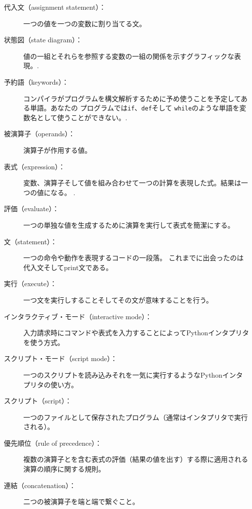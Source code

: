 \documentclass[a4j,12pt,makeidx]{jbook}
\begin{document}
{\begin{description}
\item[代入文（assignment statement）：]一つの値を一つの変数に割り当てる文。

\item[状態図（state diagram）：]値の一組とそれらを参照する変数の一組の関係を示すグラフィックな表現。.

\item[予約語（keywords）：]コンパイラがプログラムを構文解析するために予め使うことを予定してある単語。あなたの
プログラムでは{\tt if}、{\tt  def}そして {\tt while}のような単語を変数名として使うことができない。.

\item[被演算子（operands）：]演算子が作用する値。 

\item[表式（expression）：]変数、演算子そして値を組み合わせて一つの計算を表現した式。結果は一つの値になる。 .

\item[評価（evaluate）：] 一つの単独な値を生成するために演算を実行して表式を簡潔にする。

\item[文（statement）：]一つの命令や動作を表現するコードの一段落。 これまでに出会ったのは代入文そしてprint文である。

\item[実行（execute）：] 一つ文を実行しすることそしてその文が意味することを行う。

\item[インタラクティブ・モード（interactive mode）：] 入力請求時にコマンドや表式を入力することによってPythonインタプリタを使う方式。

\item[スクリプト・モード（script mode）：] 一つのスクリプトを読み込みそれを一気に実行するようなPythonインタプリタの使い方。

\item[スクリプト（script）：]一つのファイルとして保存されたプログラム（通常はインタプリタで実行される）。

\item[優先順位（rule of precedence）：]複数の演算子とを含む表式の評価（結果の値を出す）する際に適用される演算の順序に関する規則。

\item[連結（concatenation）：]二つの被演算子を端と端で繋ぐこと。 


\end{description}}
\end{document}
